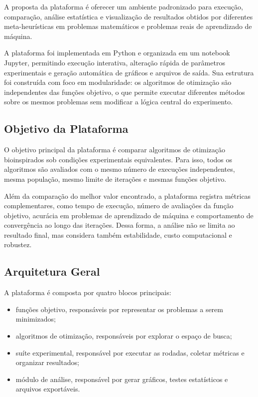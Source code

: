 % 
%

A proposta da plataforma é oferecer um ambiente padronizado para execução, comparação, análise estatística e visualização de resultados obtidos por diferentes meta-heurísticas em problemas matemáticos e problemas reais de aprendizado de máquina.

A plataforma foi implementada em Python e organizada em um notebook Jupyter, permitindo execução interativa, alteração rápida de parâmetros experimentais e geração automática de gráficos e arquivos de saída. Sua estrutura foi construída com foco em modularidade: os algoritmos de otimização são independentes das funções objetivo, o que permite executar diferentes métodos sobre os mesmos problemas sem modificar a lógica central do experimento.

\subsection{Objetivo da Plataforma}

O objetivo principal da plataforma é comparar algoritmos de otimização bioinspirados sob condições experimentais equivalentes. Para isso, todos os algoritmos são avaliados com o mesmo número de execuções independentes, mesma população, mesmo limite de iterações e mesmas funções objetivo.

Além da comparação do melhor valor encontrado, a plataforma registra métricas complementares, como tempo de execução, número de avaliações da função objetivo, acurácia em problemas de aprendizado de máquina e comportamento de convergência ao longo das iterações. Dessa forma, a análise não se limita ao resultado final, mas considera também estabilidade, custo computacional e robustez.

\subsection{Arquitetura Geral}

A plataforma é composta por quatro blocos principais:

\begin{itemize}
    \item funções objetivo, responsáveis por representar os problemas a serem minimizados;
    \item algoritmos de otimização, responsáveis por explorar o espaço de busca;
    \item suíte experimental, responsável por executar as rodadas, coletar métricas e organizar resultados;
    \item módulo de análise, responsável por gerar gráficos, testes estatísticos e arquivos exportáveis.
\end{itemize}

